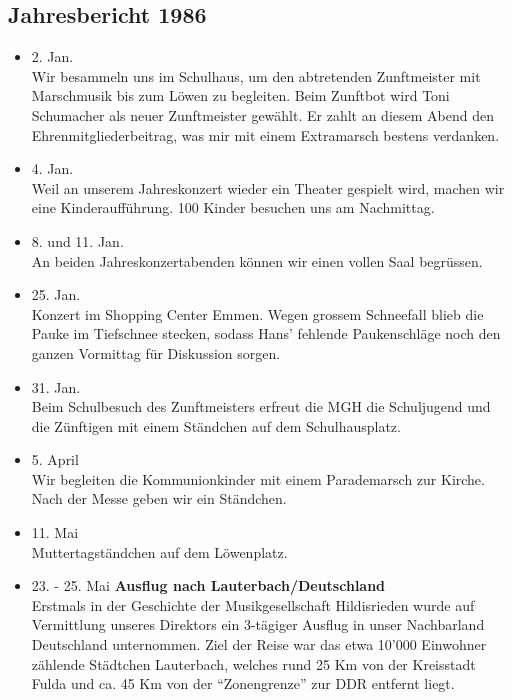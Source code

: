\subsection{Jahresbericht 1986}

\begin{history}


    \begin{itemize}

        \item[]2. Jan.\\
        Wir besammeln uns im Schulhaus, um den abtretenden Zunftmeister mit
        Marschmusik bis zum Löwen zu begleiten. Beim Zunftbot wird Toni
        Schumacher als neuer Zunftmeister gewählt. Er zahlt an diesem Abend den
        Ehrenmitgliederbeitrag, was mir mit einem Extramarsch bestens verdanken.

        \item[]4. Jan.\\
        Weil an unserem Jahreskonzert wieder ein Theater gespielt wird, machen
        wir eine Kinderaufführung. 100 Kinder besuchen uns am Nachmittag.

        \item[]8. und 11. Jan.\\
        An beiden Jahreskonzertabenden können wir einen vollen Saal begrüssen.

        \item[]25. Jan.\\
        Konzert im Shopping Center Emmen. Wegen grossem Schneefall blieb die
        Pauke im Tiefschnee stecken, sodass Hans' fehlende Paukenschläge noch
        den ganzen Vormittag für Diskussion sorgen.

        \item[]31. Jan.\\
        Beim Schulbesuch des Zunftmeisters erfreut die MGH die Schuljugend und
        die Zünftigen mit einem Ständchen auf dem Schulhausplatz.

        \item[]5. April\\
        Wir begleiten die Kommunionkinder mit einem Parademarsch zur Kirche.
        Nach der Messe geben wir ein Ständchen.

        \item[]11. Mai\\
        Muttertagständchen auf dem Löwenplatz.

        \item[]23. - 25. Mai \textbf{Ausflug nach Lauterbach/Deutschland}\\
        Erstmals in der Geschichte der Musikgesellschaft Hildisrieden wurde auf
        Vermittlung unseres Direktors ein 3-tägiger Ausflug in unser Nachbarland
        Deutschland unternommen. Ziel der Reise war das etwa 10'000 Einwohner
        zählende Städtchen Lauterbach, welches rund 25 Km von der Kreisstadt
        Fulda und ca. 45 Km von der \enquote{Zonengrenze} zur DDR entfernt
        liegt.


\end{itemize}
\end{history}
